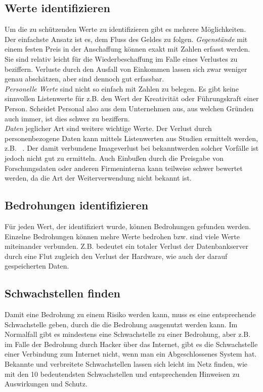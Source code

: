 \subsection{Werte identifizieren}
Um die zu schützenden Werte zu identifizieren gibt es mehrere Möglichkeiten. Der einfachste Ansatz ist es, dem Fluss des Geldes zu folgen. \textit{Gegenstände} mit einem festen Preis in der Anschaffung können exakt mit Zahlen erfasst werden. Sie sind relativ leicht für die Wiederbeschaffung im Falle eines Verlustes zu beziffern. Verluste durch den Ausfall von Einkommen lassen sich zwar weniger genau abschätzen, aber sind dennoch gut erfassbar.\\
\textit{Personelle Werte} sind nicht so einfach mit Zahlen zu belegen. Es gibt keine sinnvollen Listenwerte für z.B. den Wert der Kreativität oder Führungskraft einer Person. Scheidet Personal also aus dem Unternehmen aus, aus welchen Gründen auch immer, ist dies schwer zu beziffern.\\
\textit{Daten} jeglicher Art sind weitere wichtige Werte. Der Verlust durch personenbezogene Daten kann mittels Listenwerten aus Studien ermittelt werden, z.B. ~\cite{poneman2014}. Der damit verbundene Imageverlust bei bekanntwerden solcher Vorfälle ist jedoch nicht gut zu ermitteln. Auch Einbußen durch die Preisgabe von Forschungsdaten oder anderen Firmeninterna kann teilweise schwer bewertet werden, da die Art der Weiterverwendung nicht bekannt ist.

\subsection{Bedrohungen identifizieren}
Für jeden Wert, der identifiziert wurde, können Bedrohungen gefunden werden. Einzelne Bedrohungen können mehre Werte bedrohen bzw. sind viele Werte miteinander verbunden. Z.B. bedeutet ein totaler Verlust der Datenbankserver durch eine Flut  zugleich den Verlust der Hardware, wie auch der darauf gespeicherten Daten.

\subsection{Schwachstellen finden}
Damit eine Bedrohung zu einem Risiko werden kann, muss es eine entsprechende Schwachstelle geben, durch die die Bedrohung ausgenutzt werden kann. Im Normalfall gibt es mindestens eine Schwachstelle zu einer Bedrohung, aber z.B. im Falle der Bedrohung durch Hacker über das Internet, gibt es die Schwachstelle einer Verbindung zum Internet nicht, wenn man ein Abgeschlossenes System hat. Bekannte und verbreitete Schwachstellen lassen sich leicht im Netz finden, wie ~\cite{owasp2013} mit den 10 bedeutendsten Schwachstellen und entsprechenden Hinweisen zu Auswirkungen und Schutz.
